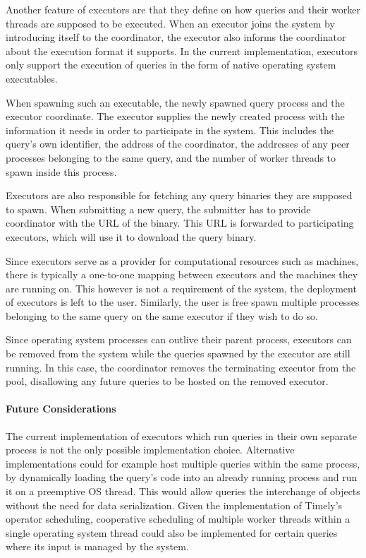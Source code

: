Another feature of executors are that they define on how queries and their
worker threads are supposed to be executed. When an executor joins
the system by introducing itself to the coordinator, the executor also informs
the coordinator about the execution format it supports. In the current
implementation, executors only support the execution of queries in the form of
native operating system executables.

When spawning such an executable, the newly spawned query process and the
executor coordinate. The executor supplies the newly created process with the information
it needs in order to participate in the system. This includes the query's own identifier,
the address of the coordinator, the addresses of any peer processes belonging to the 
same query, and the number of worker threads to spawn inside this process.

Executors are also responsible for fetching any query binaries they are supposed
to spawn. When submitting a new query, the submitter has to provide coordinator
with the URL of the binary. This URL is forwarded to participating executors,
which will use it to download the query binary. 

Since executors serve as a provider for computational resources such as machines,
there is typically a one-to-one mapping between executors and the machines they
are running on. This however is not a requirement of the system, the deployment of
executors is left to the user. Similarly, the user is free spawn multiple
processes belonging to the same query on the same executor if they wish to do so.

Since operating system processes can outlive their parent process, executors can
be removed from the system while the queries spawned by the executor are still
running. In this case, the coordinator removes the terminating executor from
the pool, disallowing any future queries to be hosted on the removed executor.

\paragraph{Future Considerations}

The current implementation of executors which run queries in their own separate
process is not the only possible implementation choice.
Alternative implementations could for example host multiple queries
within the same process, by dynamically loading the query's code into an already
running process and run it on a preemptive OS thread. This would allow queries
the interchange of objects without the need for data serialization. Given
the implementation of Timely's operator scheduling, cooperative scheduling
of multiple worker threads within a single operating system thread could also
be implemented for certain queries where its input is managed by the system.


